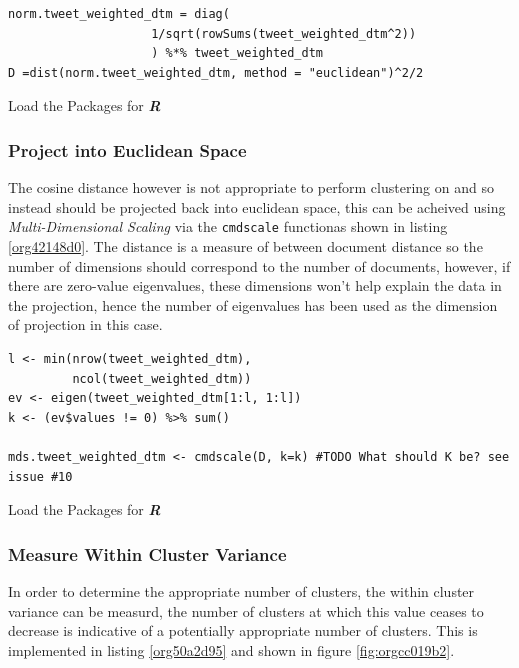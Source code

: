 \documentclass[11pt]{article}
\begin{document}
\begin{listing}[htbp]
\begin{verbatim}
norm.tweet_weighted_dtm = diag(
                    1/sqrt(rowSums(tweet_weighted_dtm^2))
                    ) %*% tweet_weighted_dtm
D =dist(norm.tweet_weighted_dtm, method = "euclidean")^2/2
\end{verbatim}
\caption{\label{orge74aa3d}Load the Packages for \textbf{\textbf{\emph{R}}}}
\end{listing}

\subsubsection{Project into Euclidean Space}
\label{sec:orgcf36868}
The cosine distance however is not appropriate to perform clustering on and so instead should be projected back into euclidean space, this can be acheived using \emph{Multi-Dimensional Scaling} via the \texttt{cmdscale} functionas shown in listing \ref{org42148d0}. The distance is a measure of between document distance so the number of dimensions should correspond to the number of documents, however, if there are zero-value eigenvalues, these dimensions won't help explain the data in the projection, hence the number of eigenvalues has been used as the dimension of projection in this case.

\begin{listing}[htbp]
\begin{verbatim}
l <- min(nrow(tweet_weighted_dtm),
         ncol(tweet_weighted_dtm))
ev <- eigen(tweet_weighted_dtm[1:l, 1:l])
k <- (ev$values != 0) %>% sum()

mds.tweet_weighted_dtm <- cmdscale(D, k=k) #TODO What should K be? see issue #10
\end{verbatim}
\caption{\label{org42148d0}Load the Packages for \textbf{\textbf{\emph{R}}}}
\end{listing}

\subsubsection{Measure Within Cluster Variance}
\label{sec:org2788d57}
In order to determine the appropriate number of clusters, the within cluster
variance can be measurd, the number of clusters at which this value ceases to
decrease is indicative of a potentially appropriate number of clusters. This is
implemented in listing \ref{org50a2d95} and shown in figure \ref{fig:orgcc019b2}.
\end{document}
